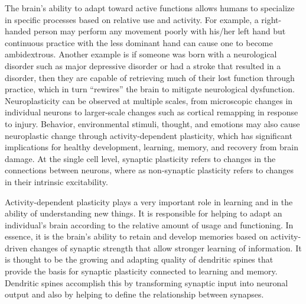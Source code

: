The brain's ability to adapt toward active functions allows humans to specialize in specific processes based on relative use and activity. For example, a right-handed person may perform any movement poorly with his/her left hand but continuous practice with the less dominant hand can cause one to become ambidextrous. Another example is if someone was born with a neurological disorder such as major depressive disorder or had a stroke that resulted in a disorder, then they are capable of retrieving much of their lost function through practice, which in turn ``rewires'' the brain to mitigate neurological dysfunction.
Neuroplasticity can be observed at multiple scales, from microscopic changes in individual neurons to larger-scale changes such as cortical remapping in response to injury. Behavior, environmental stimuli, thought, and emotions may also cause neuroplastic change through activity-dependent plasticity, which has significant implications for healthy development, learning, memory, and recovery from brain damage. At the single cell level, synaptic plasticity refers to changes in the connections between neurons, where as non-synaptic plasticity refers to changes in their intrinsic excitability.

Activity-dependent plasticity plays a very important role in learning and in the ability of understanding new things. It is responsible for helping to adapt an individual's brain according to the relative amount of usage and functioning. In essence, it is the brain's ability to retain and develop memories based on activity-driven changes of synaptic strength that allow stronger learning of information. It is thought to be the growing and adapting quality of dendritic spines that provide the basis for synaptic plasticity connected to learning and memory. Dendritic spines accomplish this by transforming synaptic input into neuronal output and also by helping to define the relationship between synapses.


